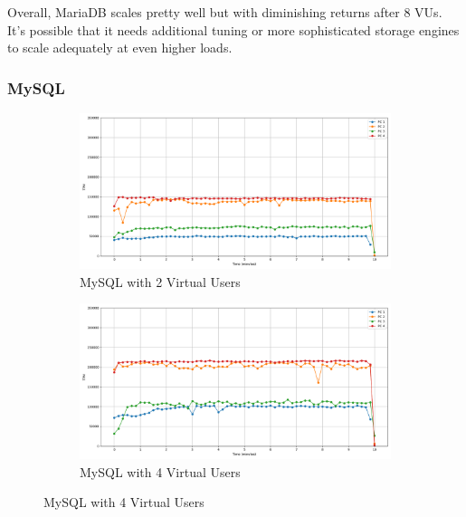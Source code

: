 Overall, MariaDB scales pretty well but with diminishing returns after 8 VUs. It's possible that it needs additional tuning or more sophisticated storage engines to scale adequately at even higher loads.

\subsubsection{MySQL}

\begin{figure}[H]
    \centering
    \hspace*{-1.7cm}
    \begin{subfigure}[b]{0.6\textwidth}
        \centering
        \includegraphics[width=\linewidth]{Images/hdbtcount_MySQL_2.png}
        \caption{MySQL with 2 Virtual Users}
        \label{fig:mysql-2vu}
    \end{subfigure}%
    \begin{subfigure}[b]{0.6\textwidth}
        \centering
        \includegraphics[width=\linewidth]{Images/hdbtcount_MySQL_4.png}
        \caption{MySQL with 4 Virtual Users}
        \label{fig:mysql-4vu}
    \end{subfigure}

    \vspace{0.5cm}


\end{figure}

